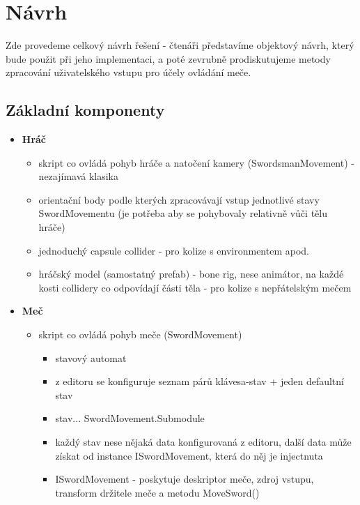 \chapter{Návrh}

Zde provedeme celkový návrh řešení - čtenáři představíme objektový návrh, který bude použit při jeho implementaci, a poté zevrubně prodiskutujeme metody zpracování uživatelského vstupu pro účely ovládání meče.


\section{Základní komponenty}

\begin{itemize}
    \item \textbf{Hráč}
        \begin{itemize}
            \item skript co ovládá pohyb hráče a natočení kamery (SwordsmanMovement) - nezajímavá klasika
            \item orientační body podle kterých zpracovávají vstup jednotlivé stavy SwordMovementu (je potřeba aby se pohybovaly relativně vůči tělu hráče)
            \item jednoduchý capsule collider - pro kolize s environmentem apod.
            \item hráčský model (samostatný prefab) - bone rig, nese animátor, na každé kosti collidery co odpovídají části těla - pro kolize s nepřátelským mečem 
        \end{itemize} 
    \item \textbf{Meč} 
        \begin{itemize}
            \item skript co ovládá pohyb meče (SwordMovement)
                \begin{itemize}
                    \item stavový automat
                    \item z editoru se konfiguruje seznam párů klávesa-stav + jeden defaultní stav
                    \item stav... SwordMovement.Submodule
                    \item každý stav nese nějaká data konfigurovaná z editoru, další data může získat od instance ISwordMovement, která do něj je injectnuta
                    \item ISwordMovement - poskytuje deskriptor meče, zdroj vstupu, transform držitele meče a metodu MoveSword()

\end{itemize}
\end{itemize}
\end{itemize}
